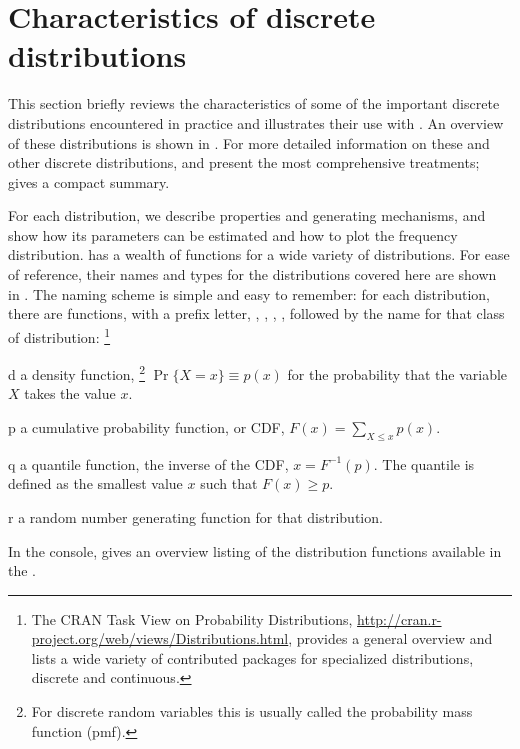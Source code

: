 \documentclass[11pt]{book}\usepackage[]{graphicx}\usepackage[]{color}
\begin{document}
\section{Characteristics of  discrete distributions}\label{sec:discrete-distrib}
This section briefly reviews the characteristics of some of the
important discrete distributions encountered in practice and illustrates their
use with \R.
An overview of these distributions is shown in .
For more detailed information on these and other discrete distributions,
\citet{Johnson-etal:92} and \citet{WimmerAltman:1999:thesaurus}
present the most comprehensive treatments;
\citet[]{Zelterman:99} gives a compact summary.



For each distribution, we describe properties and generating
mechanisms, and show how its parameters can be estimated
and how to plot the frequency distribution.  \R has a wealth of
functions for a wide variety of distributions.  For ease of reference,
their names and types for the distributions covered here are shown
in . The naming scheme is simple and easy to
remember:  for each distribution, there are functions, with a prefix
letter, , , , , followed by the
name for that class of distribution:%
\footnote{The CRAN Task View on Probability Distributions,
\url{http://cran.r-project.org/web/views/Distributions.html},
provides a general overview and lists a wide variety of contributed
packages for specialized distributions, discrete and continuous.}
\begin{description*}
  \item[d] a density function,%
\footnote{
For discrete random variables this is usually called the probability mass function (pmf).
}
  $\Pr \{X = x\} \equiv p(x)$
for the probability that the variable $X$ takes the value $x$.
  \item[p] a cumulative probability function, or CDF, 
  $F(x) = \sum_{X\le x} p(x)$.
  \item[q] a quantile function, the inverse of the CDF, $x = F^{-1} (p)$. 
  The quantile  is defined as the smallest value $x$ such that $F(x) \ge p$. 
  \item[r] a random number generating function for that distribution.
\end{description*}
In the \R console,  gives an overview listing of
the distribution functions available in the .
\end{document}
